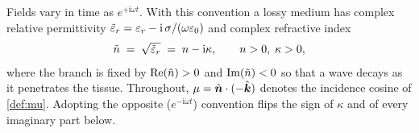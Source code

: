 \begin{remark}\label{rem:convention}
Fields vary in time as $e^{+\mathrm{i}\omega t}$. With this convention a lossy
medium has complex relative permittivity
$\tilde{\varepsilon}_r = \varepsilon_r - \mathrm{i}\,\sigma/(\omega\varepsilon_0)$ and
complex refractive index
\begin{equation}\label{eq:n-convention}
  \tilde{n} \;=\; \sqrt{\tilde{\varepsilon}_r} \;=\; n - \mathrm{i}\kappa,
  \qquad n>0,\;\kappa>0,
\end{equation}
where the branch is fixed by $\operatorname{Re}(\tilde{n})>0$ and $\operatorname{Im}(\tilde{n})<0$ so that a
wave decays as it penetrates the tissue. Throughout, $\mu = \hat{\bm{n}}\cdot(-\hat{\bm{k}})$
denotes the incidence cosine of \cref{def:mu}. Adopting the opposite
($e^{-\mathrm{i}\omega t}$) convention flips the sign of $\kappa$ and of every
imaginary part below.
\end{remark}
